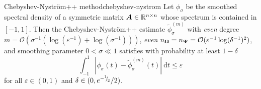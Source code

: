 \begin{theorem}{Chebyshev-Nyström++ method}{chebyshev-nystrom}
    Let $\phi_{\sigma}$ be the smoothed spectral density of a symmetric matrix $\boldsymbol{A} \in \mathbb{R}^{n \times n}$ whose spectrum is contained in $[-1, 1]$. Then the Chebyshev-Nyström++ estimate $\widetilde{\phi}_{\sigma}^{(m)}$ with \emph{even} degree $m = \mathcal{O}(\sigma^{-1}(\log(\varepsilon^{-1}) + \log(\sigma^{-1})))$, \emph{even} $n_{\boldsymbol{\Omega}} = n_{\boldsymbol{\Psi}} = \mathcal{O}(\varepsilon^{-1}\log(\delta^{-1})^2)$, and smoothing parameter $0 < \sigma \ll 1$ satisfies with probability at least $1 - \delta$
    \begin{equation}
        \int_{-1}^{1} \left| \phi_{\sigma}(t) - \widetilde{\phi}_{\sigma}^{(m)}(t) \right|~\mathrm{d}t \leq \varepsilon
        \label{equ:chebyshev-nystrom-error}
    \end{equation}
    for all $\varepsilon \in (0, 1)$ and $\delta \in (0, e^{-{}^{1}{\mskip -5mu/\mskip -3mu}_{2}}/2)$.
\end{theorem}

